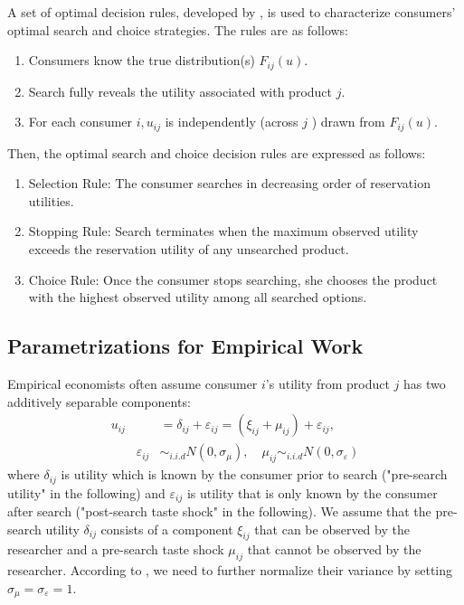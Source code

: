 \documentclass[12pt]{article}
\begin{document}
A set of optimal decision rules, developed by
\cite{weitzman1979optimal}, is used to characterize consumers' optimal search and choice strategies. 
The rules are as follows:
\begin{enumerate}
    \item Consumers know the true distribution(s) \(F_{i j}(u)\).
    \item Search fully reveals the utility associated with product \(j\).
    \item For each consumer \(i, u_{i j}\) is independently (across \(j\) ) drawn from \(F_{i j}(u)\).
\end{enumerate}
Then, the optimal search and choice decision
rules are expressed as follows:
\begin{enumerate}
    \item Selection Rule: The consumer searches in decreasing order of reservation utilities.
    \item Stopping Rule: Search terminates when the maximum observed utility exceeds the reservation utility of any unsearched product.
    \item Choice Rule: Once the consumer stops searching, she chooses the product with the highest observed utility among all searched options.
\end{enumerate}

\subsection{Parametrizations for Empirical Work}

Empirical economists often assume consumer $i$'s utility from product $j$ has two additively separable components:
\begin{align}
    u_{i j} & =\delta_{i j}+\varepsilon_{i j}  =\left(\xi_{i j}+\mu_{i j}\right)+\varepsilon_{i j},\\
    \quad \quad \varepsilon_{i j}&\sim_{i.i.d} N(0,\sigma_{\mu}),\quad \mu_{i j} \sim_{i.i.d} N(0,\sigma_{\varepsilon})\nonumber
\end{align}
where \(\delta_{i j}\) is utility which is known by the consumer prior to search ("pre-search
utility" in the following) and \(\varepsilon_{i j}\) is utility that is only known by the consumer
after search ("post-search taste shock" in the following). 
We assume that the pre-search utility
\(\delta_{i j}\) consists of a component \(\xi_{i j}\) that can be observed by the researcher and a pre-search taste shock \(\mu_{i j}\) that
cannot be observed by the researcher. 
According to \cite{ursu2023sequential}, we need to further normalize their variance by setting $\sigma_{\mu}= \sigma_{\varepsilon} =1$. 
\end{document}
